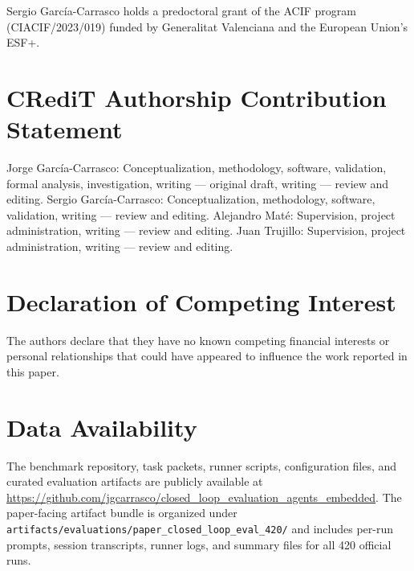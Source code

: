 \documentclass[a4paper,fleqn]{cas-dc}
\DeclareRobustCommand{\tool}[1]{\texttt{\nolinkurl{#1}}}
\begin{document}
Sergio García-Carrasco holds a predoctoral grant of the ACIF program (CIACIF/2023/019) funded by Generalitat Valenciana and the European Union's ESF+.

\section*{CRediT Authorship Contribution Statement}

Jorge García-Carrasco: Conceptualization, methodology, software, validation, formal analysis, investigation, writing --- original draft, writing --- review and editing. Sergio García-Carrasco: Conceptualization, methodology, software, validation, writing --- review and editing. Alejandro Maté: Supervision, project administration, writing --- review and editing. Juan Trujillo: Supervision, project administration, writing --- review and editing.

\section*{Declaration of Competing Interest}

The authors declare that they have no known competing financial interests or personal relationships that could have appeared to influence the work reported in this paper.

\section*{Data Availability}

The benchmark repository, task packets, runner scripts, configuration files, and curated evaluation artifacts are publicly available at \url{https://github.com/jgcarrasco/closed_loop_evaluation_agents_embedded}. The paper-facing artifact bundle is organized under \tool{artifacts/evaluations/paper_closed_loop_eval_420/} and includes per-run prompts, session transcripts, runner logs, and summary files for all 420 official runs.



\end{document}
